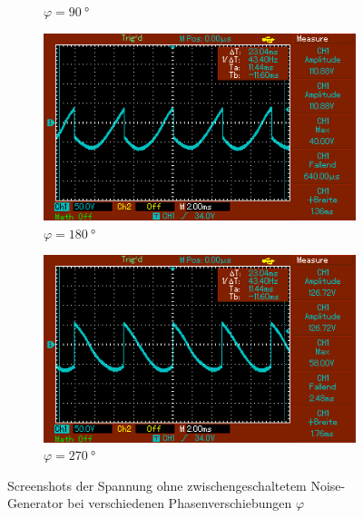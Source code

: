 \begin{figure}
\begin{subfigure}{0.3\textwidth}
        \caption{$\varphi = \SI{90}{\degree}$}
        \label{fig:1_90}
    \end{subfigure}
    \par\medskip %
    \begin{subfigure}{0.3\textwidth}
        \centering
        \includegraphics[width=\textwidth]{images/1_180.png}
        \caption{$\varphi = \SI{180}{\degree}$}
        \label{fig:1_180}
    \end{subfigure}
    \begin{subfigure}{0.3\textwidth}
        \centering
        \includegraphics[width=\textwidth]{images/1_270.png}
        \caption{$\varphi = \SI{270}{\degree}$}
        \label{fig:1_270}
    \end{subfigure}
    \caption{Screenshots der Spannung ohne zwischengeschaltetem Noise-Generator bei verschiedenen Phasenverschiebungen $\varphi$}
    \label{fig:1}
\end{figure}

